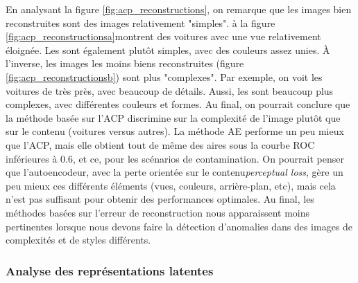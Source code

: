 En analysant la figure \ref{fig:acp_reconstructions}, on remarque que les images bien reconstruites sont des images relativement "simples". \DIFdelbegin {}\DIFdelend \DIFaddbegin {}\DIFaddend à la figure \ref{fig:acp_reconstructionsa}\DIFaddbegin \DIFadd{, }\DIFaddend montrent des voitures avec une vue relativement éloignée. Les \DIFdelbegin {}\DIFdelend \DIFaddbegin {}\DIFaddend sont également plutôt simples, avec des couleurs assez unies. À l'inverse, les images les moins biens reconstruites (figure \ref{fig:acp_reconstructionsb}) sont plus "complexes". Par exemple, on voit les voitures de très près, avec beaucoup de détails. Aussi, les \DIFdelbegin {}\DIFdelend \DIFaddbegin {}\DIFaddend sont beaucoup plus complexes, avec différentes couleurs et formes. Au final, on pourrait conclure que la méthode basée sur l'ACP discrimine sur la complexité de l'image plutôt que sur le contenu (voitures versus autres). La méthode AE performe un peu mieux que l'ACP, mais elle obtient tout de même des aires sous la courbe ROC inférieures à 0.6, et ce, pour les \DIFdelbegin {}\DIFdelend \DIFaddbegin {}\DIFaddend scénarios de contamination. On pourrait penser que l'autoencodeur, avec la perte orientée sur le contenu\DIFaddbegin \DIFadd{, }\DIFaddend \textit{perceptual loss}, gère un peu mieux ces différents éléments (vues, couleurs, arrière-plan, etc), mais cela n'est pas suffisant pour obtenir des performances optimales. Au final, les méthodes basées sur l'erreur de reconstruction nous apparaissent moins pertinentes lorsque nous devons faire la détection d'anomalies dans des images de complexités et de styles différents.


\subsubsection{Analyse des représentations latentes} \label{analyse_lat_cars}

